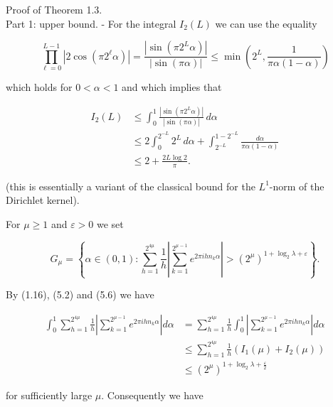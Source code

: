 \documentclass[10pt]{article}
\newcommand{\1}{\mathbf{1}}
\begin{document}
Proof of Theorem 1.3.\\
Part 1: upper bound. - For the integral $I_{2}(L)$ we can use the equality


\begin{equation*}
\prod_{\ell=0}^{L-1}\left|2 \cos \left(\pi 2^{\ell} \alpha\right)\right|=\frac{|\sin(\pi2^L\alpha)|}{|\sin(\pi\alpha)|} \leqslant \min \left(2^{L}, \frac{1}{\pi \alpha(1-\alpha)}\right) \tag{5.5}
\end{equation*}


which holds for $0<\alpha<1$ and which implies that

\begin{equation*}
\begin{aligned}
I_2(L)
&\leqslant\int_0^1\frac{|\sin(\pi2^L\alpha)|}{|\sin(\pi\alpha)|}\,d\alpha\\
&\leqslant2\int_0^{2^{-L}}2^L\,d\alpha
 +\int_{2^{-L}}^{1-2^{-L}}\frac{d\alpha}{\pi\alpha(1-\alpha)}\\
&\leqslant2+\frac{2L\log2}{\pi}.
\end{aligned}
\tag{5.6}
\end{equation*}

(this is essentially a variant of the classical bound for the $L^{1}$-norm of the Dirichlet kernel).

For $\mu \geqslant 1$ and $\varepsilon>0$ we set


\begin{equation*}
G_{\mu}=\left\{\alpha \in(0,1): \sum_{h=1}^{2^{4 \mu}} \frac{1}{h}\left|\sum_{k=1}^{2^{\mu-1}} e^{2 \pi i h n_{k} \alpha}\right|>\left(2^{\mu}\right)^{1+\log _{2} \lambda+\varepsilon}\right\} . \tag{5.7}
\end{equation*}


By (1.16), (5.2) and (5.6) we have

$$
\begin{aligned}
\int_{0}^{1} \sum_{h=1}^{2^{4 \mu}} \frac{1}{h}\left|\sum_{k=1}^{2^{\mu-1}} e^{2 \pi i h n_{k} \alpha}\right| d \alpha & =\sum_{h=1}^{2^{4 \mu}} \frac{1}{h} \int_{0}^{1}\left|\sum_{k=1}^{2^{\mu-1}} e^{2 \pi i h n_{k} \alpha}\right| d \alpha \\
& \leqslant \sum_{h=1}^{2^{4 \mu}} \frac{1}{h}\left(I_{1}(\mu)+I_{2}(\mu)\right) \\
& \leqslant\left(2^{\mu}\right)^{1+\log _{2} \lambda+\frac{\varepsilon}{2}}
\end{aligned}
$$

for sufficiently large $\mu$. Consequently we have
\end{document}
